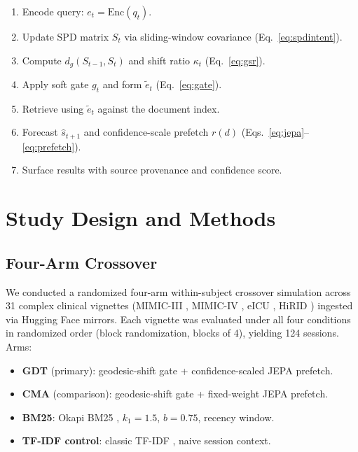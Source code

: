 \documentclass[journal,10pt,twoside]{IEEEtran}
\begin{document}
\begin{enumerate}
  \item Encode query: $e_t = \mathrm{Enc}(q_t)$.
  \item Update SPD matrix $S_t$ via sliding-window covariance (Eq.~\ref{eq:spdintent}).
  \item Compute $d_g(S_{t-1},S_t)$ and shift ratio $\kappa_t$ (Eq.~\ref{eq:gsr}).
  \item Apply soft gate $g_t$ and form $\tilde{e}_t$ (Eq.~\ref{eq:gate}).
  \item Retrieve using $\tilde{e}_t$ against the document index.
  \item Forecast $\hat{s}_{t+1}$ and confidence-scale prefetch $r(d)$ (Eqs.~\ref{eq:jepa}--\ref{eq:prefetch}).
  \item Surface results with source provenance and confidence score.
\end{enumerate}

\section{Study Design and Methods}
\label{sec:methods}

\subsection{Four-Arm Crossover}

We conducted a randomized four-arm within-subject crossover simulation across 31 complex clinical vignettes (MIMIC-III \cite{johnson2016_mimic3}, MIMIC-IV \cite{pollard2018_mimic4}, eICU \cite{pollard2018_eicu}, HiRID \cite{muller2021_hirid}) ingested via Hugging Face mirrors. Each vignette was evaluated under all four conditions in randomized order (block randomization, blocks of 4), yielding 124 sessions. Arms:
\begin{itemize}
  \item \textbf{GDT} (primary): geodesic-shift gate + confidence-scaled JEPA prefetch.
  \item \textbf{CMA} (comparison): geodesic-shift gate + fixed-weight JEPA prefetch.
  \item \textbf{BM25}: Okapi BM25 \cite{robertson1995}, $k_1{=}1.5$, $b{=}0.75$, recency window.
  \item \textbf{TF-IDF control}: classic TF-IDF \cite{salton83}, naive session context.
\end{itemize}
\end{document}
